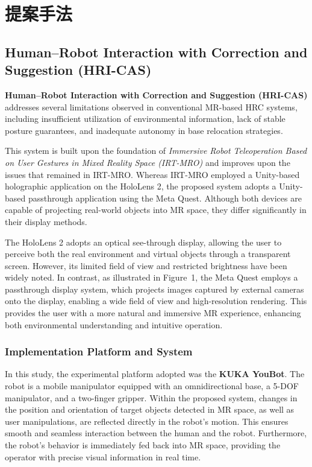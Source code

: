 \documentclass[../../main.tex]{subfiles} %
\begin{document}
\setcounter{page}{0} %

\chapter{提案手法}\label{chap:introduction}


\section{Human–Robot Interaction with Correction and Suggestion (HRI-CAS)}

\textbf{Human–Robot Interaction with Correction and Suggestion (HRI-CAS)} 
addresses several limitations observed in conventional MR-based HRC systems, 
including insufficient utilization of environmental information, 
lack of stable posture guarantees, 
and inadequate autonomy in base relocation strategies.

This system is built upon the foundation of 
\textit{Immersive Robot Teleoperation Based on User Gestures in Mixed Reality Space (IRT-MRO)} 
and improves upon the issues that remained in IRT-MRO.  
Whereas IRT-MRO employed a Unity-based holographic application on the HoloLens 2, 
the proposed system adopts a Unity-based passthrough application using the Meta Quest.  
Although both devices are capable of projecting real-world objects into MR space, 
they differ significantly in their display methods.  

The HoloLens 2 adopts an optical see-through display, 
allowing the user to perceive both the real environment and virtual objects through a transparent screen.  
However, its limited field of view and restricted brightness have been widely noted.  
In contrast, as illustrated in Figure~1, the Meta Quest employs a passthrough display system, 
which projects images captured by external cameras onto the display, 
enabling a wide field of view and high-resolution rendering.  
This provides the user with a more natural and immersive MR experience, 
enhancing both environmental understanding and intuitive operation.

\subsection{Implementation Platform and System}
In this study, the experimental platform adopted was the \textbf{KUKA YouBot}.  
The robot is a mobile manipulator equipped with an omnidirectional base, 
a 5-DOF manipulator, and a two-finger gripper.  
Within the proposed system, changes in the position and orientation of target objects 
detected in MR space, as well as user manipulations, 
are reflected directly in the robot’s motion.  
This ensures smooth and seamless interaction between the human and the robot.  
Furthermore, the robot’s behavior is immediately fed back into MR space, 
providing the operator with precise visual information in real time.
\end{document}
